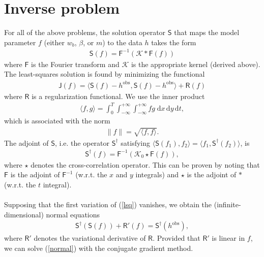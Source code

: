 \documentclass[paper=a4, fontsize=11pt]{article}
\begin{document}
\section*{Inverse problem}
For all of the above problems, the solution operator $\mathsf{S}$ that maps the model
parameter $f$ (either $w_b$, $\beta$, or $m$) to the data $h$ takes the form
\begin{align}
\mathsf{S}(f) = \mathsf{F}^{-1} \left( \mathcal{K}* \mathsf{F}(f)\right)
\end{align}
where $\mathsf{F}$ is the Fourier transform and $\mathcal{K}$ is the appropriate kernel (derived above).
The least-squares solution is found by minimizing the functional
\begin{align}
\mathsf{J}(f) = \langle \mathsf{S}(f) - h^{\mathrm{obs}} ,\mathsf{S}(f) - h^{\mathrm{obs}} \rangle + \mathsf{R}(f) \label{lsq}
\end{align}
where $\mathsf{R}$ is a regularization functional.
We use the inner product
\begin{align}
\langle f,g\rangle = \int_0^T \int_{-\infty}^{+\infty} \int_{-\infty}^{+\infty} fg \;\mathrm{d}x\,\mathrm{d}y\,\mathrm{d}t,
\end{align}
which is associated with the norm
\begin{align}
\| f \| = \sqrt{\langle f,f\rangle}.
\end{align}
The adjoint of $\mathsf{S}$, i.e. the operator $\mathsf{S}^\dagger$  satisfying
$\langle \mathsf{S}(f_1),f_2 \rangle = \langle f_1, \mathsf{S}^\dagger(f_2)
\rangle$, is
\begin{align}
\mathsf{S}^\dagger (f) = \mathsf{F}^{-1} \left( \mathcal{K}_0 \star \mathsf{F}(f)\right),
\end{align}
where $\star$ denotes the cross-correlation operator.
This can be proven by noting that $\mathsf{F}$ is the adjoint of $\mathsf{F}^{-1}$ (w.r.t. the $x$ and $y$ integrals)
and $\star$ is the adjoint of $*$ (w.r.t. the $t$ integral).\\ \\
Supposing that the first variation of (\ref{lsq}) vanishes, we obtain the
(infinite-dimensional) normal equations
\begin{align}
\mathsf{S}^\dagger (\mathsf{S}(f)) + \mathsf{R}'(f) = \mathsf{S}^\dagger (h^{\mathrm{obs}}), \label{normal}
\end{align}
where $\mathsf{R}'$ denotes the variational derivative of $\mathsf{R}$.
Provided that $\mathsf{R}'$ is linear in $f$, we can solve (\ref{normal})
with the conjugate gradient method.
\end{document}
